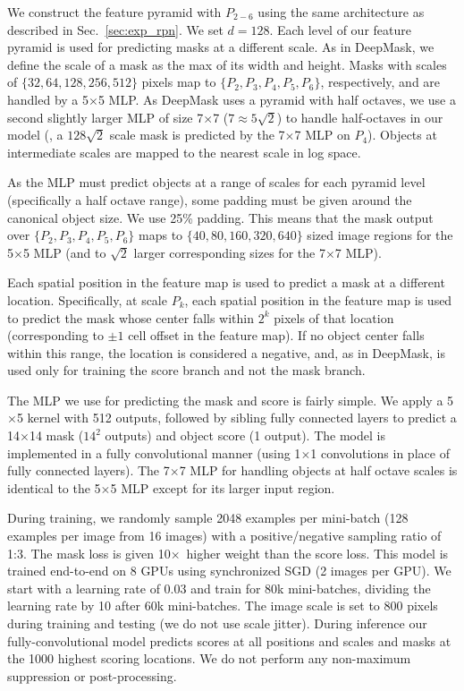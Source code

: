 \documentclass[10pt,twocolumn,letterpaper]{article}
\def\x{$\times$}
\begin{document}
We construct the feature pyramid with $P_{2-6}$ using the same architecture as described in Sec.~\ref{sec:exp_rpn}.
We set $d=128$.
Each level of our feature pyramid is used for predicting masks at a different scale.
As in DeepMask, we define the scale of a mask as the max of its width and height.
Masks with scales of $\{32, 64, 128, 256, 512\}$ pixels map to $\{P_2, P_3, P_4, P_5, P_6\}$, respectively, and are handled by a 5\x5 MLP.
As DeepMask uses a pyramid with half octaves, we use a second slightly larger MLP of size 7\x7 ($7\approx5\sqrt2$) to handle half-octaves in our model (\eg, a $128\sqrt2$ scale mask is predicted by the 7\x7 MLP on $P_4$).
Objects at intermediate scales are mapped to the nearest scale in log space.

As the MLP must predict objects at a range of scales for each pyramid level (specifically a half octave range), some padding must be given around the canonical object size.
We use 25\% padding.
This means that the mask output over $\{P_2, P_3, P_4, P_5, P_6\}$ maps to $\{40, 80, 160, 320, 640\}$ sized image regions for the 5\x5 MLP (and to $\sqrt2$ larger corresponding sizes for the 7\x7 MLP).

Each spatial position in the feature map is used to predict a mask at a different location.
Specifically, at scale $P_k$, each spatial position in the feature map is used to predict the mask whose center falls within $2^k$ pixels of that location (corresponding to $\pm1$ cell offset in the feature map).
If no object center falls within this range, the location is considered a negative, and, as in DeepMask, is used only for training the score branch and not the mask branch.

The MLP we use for predicting the mask and score is fairly simple. 
We apply a 5\x5 kernel with 512 outputs, followed by sibling fully connected layers to predict a 14\x14 mask ($14^2$ outputs) and object score (1 output).
The model is implemented in a fully convolutional manner (using 1\x1 convolutions in place of fully connected layers).
The 7\x7 MLP for handling objects at half octave scales is identical to the 5\x5 MLP except for its larger input region.

During training, we randomly sample 2048 examples per mini-batch (128 examples per image from 16 images) with a positive/negative sampling ratio of 1:3.
The mask loss is given 10\x~higher weight than the score loss.
This model is trained end-to-end on 8 GPUs using synchronized SGD (2 images per GPU).
We start with a learning rate of 0.03 and train for 80k mini-batches, dividing the learning rate by 10 after 60k mini-batches.
The image scale is set to 800 pixels during training and testing (we do not use scale jitter).
During inference our fully-convolutional model predicts scores at all positions and scales and masks at the 1000 highest scoring locations.
We do not perform any non-maximum suppression or post-processing.

{\small


}
\end{document}
